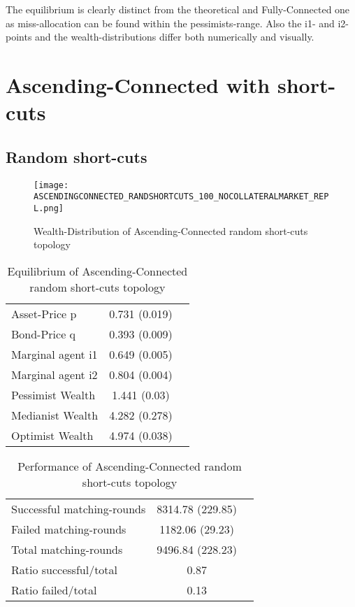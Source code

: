 \documentclass[Bachelorarbeit.tex]{subfiles}
\begin{document}
The equilibrium is clearly distinct from the theoretical and Fully-Connected one as miss-allocation can be found within the pessimists-range. Also the i1- and i2-points and the wealth-distributions differ both numerically and visually. 

\section{Ascending-Connected with short-cuts}
\label{app:results_acShortCuts}

\subsection{Random short-cuts}
\begin{figure}[H]
	\centering
  \texttt{[image: ASCENDINGCONNECTED\_RANDSHORTCUTS\_100\_NOCOLLATERALMARKET\_REPL.png]}
	\caption{Wealth-Distribution of Ascending-Connected random short-cuts topology}
	\label{fig:wealth_ASCENDINGCONNECTED_RANDSHORTCUTS_100_NOCOLLATERALMARKET_REPL}
\end{figure}

\begin{table}[H]
	\caption{Equilibrium of Ascending-Connected random short-cuts topology}
	\centering
	\begin{tabular} { l c r }
		\hline
		Asset-Price p & 0.731 (0.019) \\
		Bond-Price q & 0.393 (0.009) \\
		Marginal agent i1 & 0.649 (0.005) \\
		Marginal agent i2 & 0.804 (0.004) \\
		\hline
		Pessimist Wealth & 1.441 (0.03) \\
		Medianist Wealth & 4.282 (0.278) \\
		Optimist Wealth & 4.974 (0.038) \\
		\hline
	\end{tabular}
\end{table} 

\begin{table}[H]
	\caption{Performance of Ascending-Connected random short-cuts topology}
	\centering
	\begin{tabular} { l c r }
		\hline
		Successful matching-rounds& 8314.78 (229.85) \\
		Failed matching-rounds & 1182.06 (29.23) \\
		Total matching-rounds & 9496.84 (228.23) \\
		\hline
		Ratio successful/total & 0.87 \\
		Ratio failed/total & 0.13 \\
		\hline
	\end{tabular}
\end{table}
\end{document}
